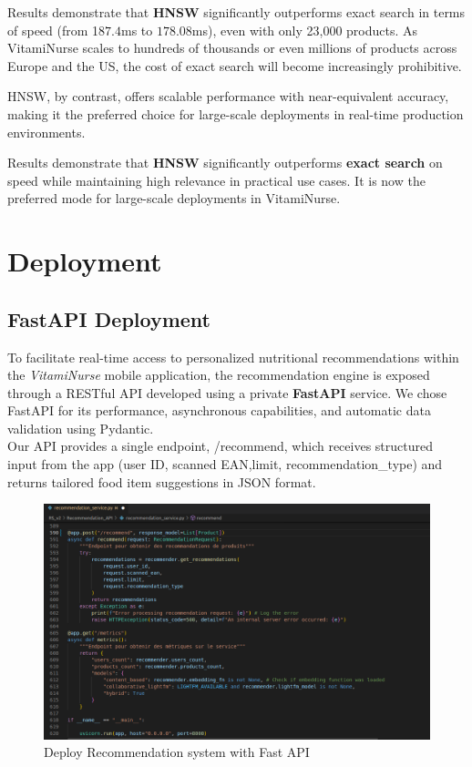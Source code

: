 Results demonstrate that \textbf{HNSW} significantly outperforms exact search in terms of speed (from 1$87.4$ms to $178.08$ms), even with only 23,000 products. As VitamiNurse scales to hundreds of thousands or even millions of products across Europe and the US, the cost of exact search will become increasingly prohibitive.

HNSW, by contrast, offers scalable performance with near-equivalent accuracy, making it the preferred choice for large-scale deployments in real-time production environments.


Results demonstrate that \textbf{HNSW} significantly outperforms \textbf{exact search} on speed while maintaining high relevance in practical use cases. It is now the preferred mode for large-scale deployments in VitamiNurse.

\newpage
\section{Deployment}
\subsection{FastAPI Deployment}
To facilitate real-time access to personalized nutritional recommendations within the \textit{VitamiNurse} mobile application, the recommendation engine is exposed through a RESTful API developed using a private \textbf{FastAPI} service. We chose FastAPI for its performance, asynchronous capabilities, and automatic data validation using Pydantic.\\

Our API provides a single endpoint, /recommend, which receives structured input from the app (user ID, scanned EAN,limit, recommendation\_type) and returns tailored food item suggestions in JSON format.

\begin{center}
    \begin{figure}[H]
        \includegraphics[scale=0.35]{images/deploy_RS.png}
    \caption{Deploy Recommendation system with Fast API} 
    \label{fig:Deploy_RS}
\end{figure}
\end{center}

